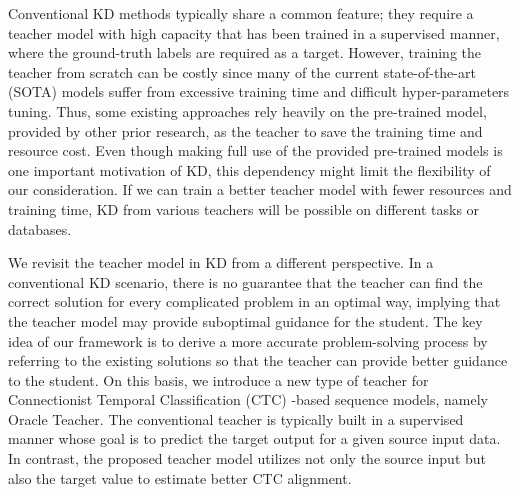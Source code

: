 \documentclass[journal]{IEEEtran}
\begin{document}
Conventional KD methods typically share a common feature; they require a teacher model with high capacity that has been trained in a supervised manner, where the ground-truth labels are required as a target.
However, training the teacher from scratch can be costly since many of the current state-of-the-art (SOTA) models suffer from
excessive training time and difficult hyper-parameters tuning.
Thus, some existing approaches rely heavily on the pre-trained model, provided by other prior research, as the teacher to save the training time and resource cost.
Even though making full use of the provided pre-trained models is one important motivation of KD, this dependency might limit the flexibility of our consideration.
If we can train a better teacher model with fewer resources and training time, KD from various teachers will be possible on different tasks or databases.


We revisit the teacher model in KD from a different perspective.
In a conventional KD scenario, there is no guarantee that the teacher can find the correct solution for every complicated problem in an optimal way, implying that the teacher model may provide suboptimal guidance for the student.
The key idea of our framework is to derive a more accurate problem-solving process by referring to the existing solutions so that the teacher can provide better guidance to the student.
On this basis, we introduce a new type of teacher for Connectionist Temporal Classification (CTC) \cite{graves-et-al:scheme}-based sequence models, namely Oracle Teacher.
The conventional teacher is typically built in a supervised manner whose goal is to predict the target output for a given source input data. 
In contrast, the proposed teacher model utilizes not only the source input but also the target value to estimate better CTC alignment.
\end{document}
